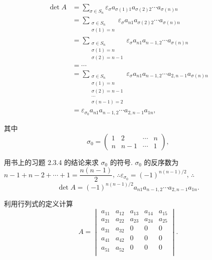 \documentclass{ctexart}
\begin{document}
\begin{solution}
    \begin{align*}
        \det A & =\sum\limits_{\sigma\in S_n}\varepsilon_\sigma a_{\sigma(1)1}a_{\sigma(2)2}\cdots a_{\sigma(n)n} \\
        & =\sum\limits_{\substack{\sigma\in S_n\\\sigma(1)=n}}\varepsilon_\sigma a_{n1}a_{\sigma(2)2}\cdots a_{\sigma(n)n} \\
        & =\sum\limits_{\substack{\sigma\in S_n\\\sigma(1)=n\\\sigma(2)=n-1}}\varepsilon_\sigma a_{n1}a_{n-1,2}\cdots a_{\sigma(n)n} \\
        & =\cdots \\
        & =\sum\limits_{\substack{\sigma\in S_n\\\sigma(1)=n\\\sigma(2)=n-1\\\cdots\\\sigma(n-1)=2}}\varepsilon_\sigma a_{n1}a_{n-1,2}\cdots a_{2,n-1}a_{\sigma(n)n} \\
        & =\varepsilon_{\sigma_0}a_{n1}a_{n-1,2}\cdots a_{2,n-1}a_{1n},
    \end{align*}

    其中
    \[\sigma_0=\begin{pmatrix}
        1 & 2 & \cdots & n \\
        n & n-1 & \cdots & 1
    \end{pmatrix},\]

    用书上的习题 2.3.4 的结论来求 $\sigma_0$ 的符号. $\sigma_0$ 的反序数为 $n-1+n-2+\cdots+1=\dfrac{n(n-1)}{2}$, $\therefore\varepsilon_{\sigma_0}=(-1)^{n(n-1)/2}$, $\therefore$
    \[\det A=(-1)^{n(n-1)/2}a_{n1}a_{n-1,2}\cdots a_{2,n-1}a_{1n}.\]
\end{solution}
\begin{exercisec}[4.1.6]
    利用行列式的定义计算
    \[A=\begin{vmatrix}
        a_{11} & a_{12} & a_{13} & a_{14} & a_{15} \\
        a_{21} & a_{22} & a_{23} & a_{24} & a_{25} \\
        a_{31} & a_{32} & 0 & 0 & 0 \\
        a_{41} & a_{42} & 0 & 0 & 0 \\
        a_{51} & a_{52} & 0 & 0 & 0 \\
    \end{vmatrix}.\]
\end{exercisec}
\end{document}
